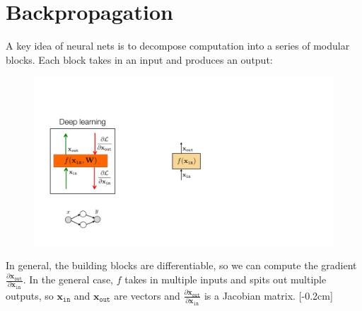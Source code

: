 \chapter{Backpropagation}\label{chapter:backpropagation}


\newcommand{\xin}{\mathbf{x}_{\texttt{in}}}
\newcommand{\xout}{\mathbf{x}_{\texttt{out}}}

A key idea of neural nets is to decompose computation into a series of modular blocks. Each block takes in an input and produces an output: 

\begin{figure}[h]
    \centering
    \includegraphics[width=0.18\linewidth]{./figures/backpropagation/mod_block.pdf}
    \label{fig:mod_block}
\end{figure}

In general, the building blocks are differentiable, so we can compute the gradient $\frac{\partial \xout}{\partial \xin}$. In the general case, $f$ takes in multiple inputs and spits out multiple outputs, so $\xin$ and $\xout$ are vectors and $\frac{\partial \xout}{\partial \xin}$ is a Jacobian matrix.%
[-0.2cm]

